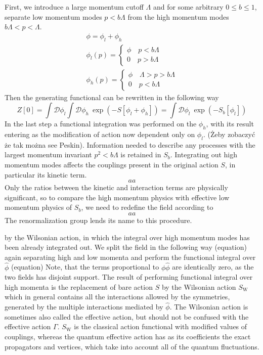 \documentclass[11pt, a4paper]{article}
\begin{document}
First, we introduce a large momentum cutoff $\Lambda$
and for some arbitrary $0\leq b \leq 1$, separate low momentum modes $p < b\Lambda$ from the high momentum modes $ b \Lambda < p < \Lambda$.
\begin{gather}
    \phi = \phi_l + \phi_h \\
    \phi_l(p) = \begin{cases}
        \phi \quad p<b\Lambda\\
        0 \quad p>b \Lambda
    \end{cases}\\
        \phi_h(p) = \begin{cases}
        \phi \quad \Lambda > p>b \Lambda\\
        0 \quad p<b\Lambda
    \end{cases}
\end{gather}
Then the generating functional can be rewritten in the following way
\begin{equation}
    Z[0] = \int \mathcal{D}\phi_l \int \mathcal{D}\phi_h \ \operatorname{exp}{\left(-S[\phi_l + \phi_h]\right)} =  \int \mathcal{D}\phi_l \ \operatorname{exp}{\left(-S_b[\phi_l]\right)}
\end{equation}
In the last step a functional integration was performed on the $\phi_h$, with its result entering as the modification of action now dependent only on $\phi_l$.
(Żeby zobaczyć że tak można see Peskin).
Information needed to describe any processes with the largest momentum invariant $p^2 < b\Lambda$ is retained in $S_b$.
Integrating out high momentum modes affects the couplings present in the original action $S$, in particular its kinetic term.
\begin{equation}
    aa
\end{equation}
Only the ratios between the kinetic and
interaction terms are physically significant, so to compare the high momentum physics with effective low momentum physics of $S_b$, we need to redefine the field according to
\begin{equation}
    aa
\end{equation}
The renormalization group lends its name to this procedure.

by the Wilsonian action, in which the integral over high momentum modes has been already integrated out.
We split the field in the following way
(equation)
again separating high and low momenta
and perform the functional integral over $\hat \phi$
(equation)
Note, that the terms proportional to $\phi \hat \phi$ are identically zero, as the two fields has disjoint support.
The result of performing functional integral over high momenta is the replacement of bare action $S$
by the Wilsonian action $S_{\text{W}}$ which in general contains all the interactions allowed by the symmetries, generated by the multiple interactions mediated by $\hat \phi$.
The Wilsonian action is sometimes also called the effective action, but should not be confused with the effective action $\Gamma$. 
$S_{\text{W}}$ is the classical action functional with modified values of couplings, whereas the quantum effective action has as its coefficients the exact propagators and vertices, which take into account all of the quantum fluctuations.
\end{document}
